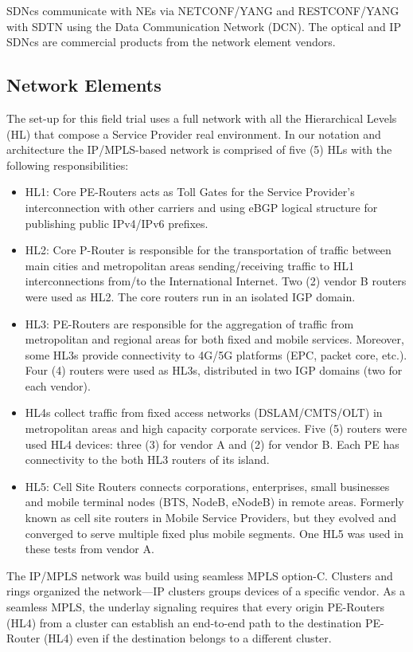 \documentclass[10pt, conference]{IEEEtran}
\begin{document}
SDNcs communicate with NEs via NETCONF/YANG and RESTCONF/YANG with SDTN  using the Data Communication Network (DCN). The optical and IP SDNcs are commercial products from the network element vendors.  

\subsection{Network Elements}
\label{sec:netlay}
The set-up for this field trial uses a full network with all the Hierarchical Levels (HL) that compose a Service Provider real environment. In our notation and architecture the IP/MPLS-based network is comprised of five (5) HLs with the following responsibilities: 

\begin{itemize}
    \item HL1: Core PE-Routers acts as Toll Gates for the Service Provider's interconnection with other carriers and using eBGP logical structure for publishing public IPv4/IPv6 prefixes. 
    \item HL2: Core P-Router is responsible for the transportation of traffic between main cities and metropolitan areas sending/receiving traffic to HL1 interconnections from/to the International Internet. Two (2) vendor B routers were used as HL2. The core routers run in an isolated IGP domain.
    \item HL3: PE-Routers are responsible for the aggregation of traffic from metropolitan and regional areas for both fixed and mobile services. Moreover, some HL3s provide connectivity to 4G/5G platforms (EPC, packet core, etc.).
    Four (4) routers were used as HL3s, distributed in two IGP domains (two for each vendor).
    \item HL4s collect traffic from fixed access networks (DSLAM/CMTS/OLT) in metropolitan areas and high capacity corporate services. Five (5) routers were used HL4 devices: three (3) for vendor A and (2) for vendor B. Each PE has connectivity to the both HL3 routers of its island.
    \item HL5: Cell Site Routers connects corporations, enterprises, small businesses and mobile terminal nodes (BTS, NodeB, eNodeB) in remote areas. Formerly known as cell site routers in Mobile Service Providers, but they evolved and converged to serve multiple fixed plus mobile segments. One HL5 was used in these tests from vendor A.
\end{itemize}

The IP/MPLS network was build using seamless MPLS option-C. Clusters and rings organized the network—IP clusters groups devices of a specific vendor. As a seamless MPLS, the underlay signaling requires that every origin PE-Routers (HL4) from a cluster can establish an end-to-end path to the destination PE-Router (HL4) even if the destination belongs to a different cluster. 
\end{document}
